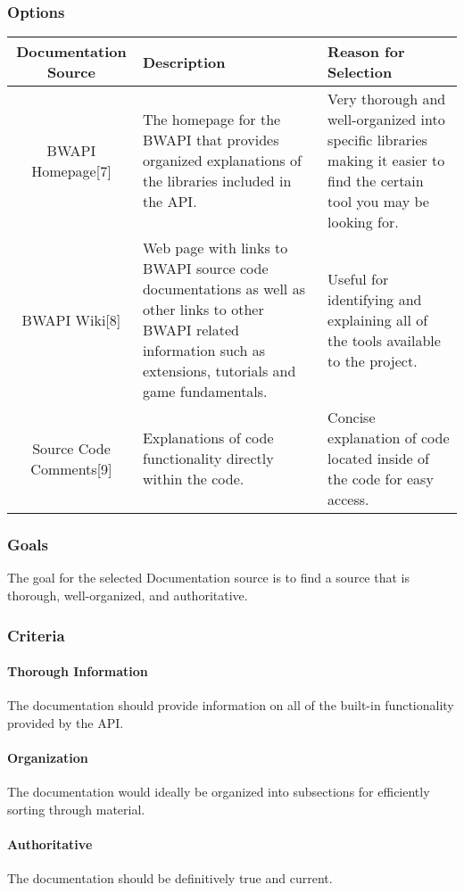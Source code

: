 \documentclass[10pt,letterpaper,onecolumn,draftclsnofoot]{IEEEtran}
\begin{document}
\subsubsection{Options}
\begin{center}
	\begin{tabular}{ ||C|L|L|| } 
		\hline
		Documentation Source & Description & Reason for Selection \\
		\hline
		BWAPI Homepage[7]  & The homepage for the BWAPI that provides organized explanations of the libraries included in the API. & Very thorough and well-organized into specific libraries making it easier to find the certain tool you may be looking for. \\ 
		\hline
		BWAPI Wiki[8] & Web page with links to BWAPI source code documentations as well as other links to other BWAPI related information such as extensions, tutorials and game fundamentals. & Useful for identifying and explaining all of the tools available to the project. \\ 
		\hline
		Source Code Comments[9] & Explanations of code functionality directly within the code. & Concise explanation of code located inside of the code for easy access. \\
		\hline
	\end{tabular}
\end{center}
\subsubsection{Goals}
The goal for the selected Documentation source is to find a source that is thorough, well-organized, and authoritative.
\subsubsection{Criteria}
	\paragraph{Thorough Information}
	The documentation should provide information on all of the built-in functionality provided by the API.
	\paragraph{Organization}
	The documentation would ideally be organized into subsections for efficiently sorting through material.
	\paragraph{Authoritative}
	The documentation should be definitively true and current.
\end{document}
